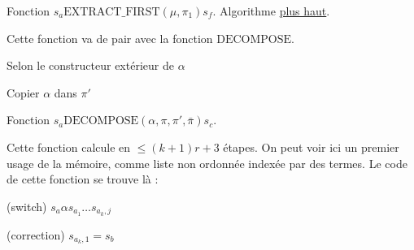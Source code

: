 \begin{appendices}
\begin{algorithm}[H]
			
			\caption{Fonction $s_a \text{EXTRACT\_FIRST}(\mu, \pi_1) s_f$. Algorithme \hyperref[algo:A_RAM_fn_extract_first]{plus haut}. }
		\end{algorithm}
		
		\espace 
		
		Cette fonction va de pair avec la fonction $\text{DECOMPOSE}$.

		\espace 
		
		\begin{algorithm}[H]
			\label{algo:A_RAM_fn_DECOMPOSE}
			
			
			Selon le constructeur extérieur de $\alpha$ \;
			
			
			Copier $\alpha$ dans $\pi'$ \;
			
			\caption{Fonction $s_a \text{DECOMPOSE}(\alpha, \pi, \pi', \bar{\pi}) s_c$.}
		\end{algorithm}
		
		\espace
		
		Cette fonction calcule en $\leq (k+1)r+3$ étapes. On peut voir ici un premier usage de la mémoire, comme liste non ordonnée indexée par des termes. Le code de cette fonction se trouve là :
		
		\espace
		
		\begin{algorithm}[H]
			\label{prog:A_RAM_fn_DECOMPOSE}
			
			
			(switch) 	$s_a \alpha s_{a_1} \dots s_{a_k,j}$\;
			
			 {
				(correction)	$s_{a_k,1} = s_b$\;
			}
			

\end{algorithm}
\end{appendices}
